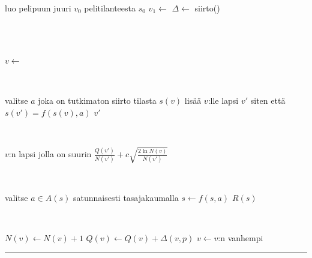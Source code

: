 \documentclass[12pt,finnish]{tktltiki2}
\theoremstyle{definition}
\theoremstyle{remark}
\begin{document}
\begin{center}
\label{UCT}
\begin{algorithmic}[0]
\begin{samepage}
	\State luo pelipuun juuri $v_0$ pelitilanteesta $s_0$
		\State $v_1 \leftarrow$ 
		\State $\Delta \leftarrow$ 
		\State {}
	\EndWhile
	\State \Return siirto()
\EndFunction
\end{samepage}
\\
\\
\begin{samepage}
			\State \Return {}
		\Else
			\State $v \leftarrow$ 
		\EndIf
	\EndWhile
	\State {}
\EndFunction
\end{samepage}
\\
\begin{samepage}
	\State valitse $a$ joka on tutkimaton siirto tilasta $s(v)$
	\State lisää $v$:lle lapsi $v'$ siten että $s(v') = f(s(v), a)$
	\State \Return $v'$
\EndFunction
\end{samepage}
\\
\begin{samepage}
	\State \Return $v$:n lapsi jolla on suurin $\frac{Q(v')}{N(v')} + c\sqrt{\frac{2 \ln N(v)}{N(v')}}$
\EndFunction
\end{samepage}
\\
\begin{samepage}
		\State valitse $a \in A(s)$ satunnaisesti tasajakaumalla
		\State $s \leftarrow f(s, a)$
	\EndWhile
	\State \Return $R(s)$ 
\EndFunction
\end{samepage}
\\
\begin{samepage}
		\State $N(v) \leftarrow N(v) + 1$
		\State $Q(v) \leftarrow Q(v) + \Delta(v, p)$
		\State $v \leftarrow v$:n vanhempi
	\EndWhile
\EndFunction
\end{samepage}
\end{algorithmic}
\rule{\textwidth}{1pt}
\end{center}
\end{document}
